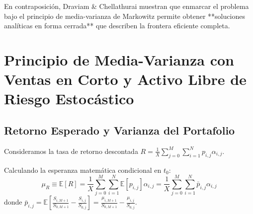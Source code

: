 \documentclass[11pt,a4paper]{report}
\numberwithin{equation}{chapter}
\begin{document}
En contraposición, Draviam \& Chellathurai muestran que enmarcar el problema bajo el principio de media-varianza de Markowitz permite obtener **soluciones analíticas en forma cerrada** que describen la frontera eficiente completa.

\chapter{Principio de Media-Varianza con Ventas en Corto y Activo Libre de Riesgo Estocástico}

\section{Retorno Esperado y Varianza del Portafolio}

Consideramos la tasa de retorno descontada $R = \frac{1}{X} \sum_{j=0}^M \sum_{i=1}^N p_{i,j} \alpha_{i,j}$.

Calculando la esperanza matemática condicional en $t_0$:
\begin{equation}
    \mu_R \equiv \mathbb{E}[R] = \frac{1}{X} \sum_{j=0}^M \sum_{i=1}^N \mathbb{E}[p_{i,j}] \alpha_{i,j} = \frac{1}{X} \sum_{j=0}^M \sum_{i=1}^N \bar{p}_{i,j} \alpha_{i,j} \label{eq:mu_R_escalar}
\end{equation}
donde $\bar{p}_{i,j} = \mathbb{E}\left[ \frac{S_{i,M+1}}{S_{0,M+1}} - \frac{S_{i,j}}{S_{0,j}} \right] = \frac{\mu_{i,M+1}}{S_{0,M+1}} - \frac{\mu_{i,j}}{S_{0,j}}$.
\end{document}
